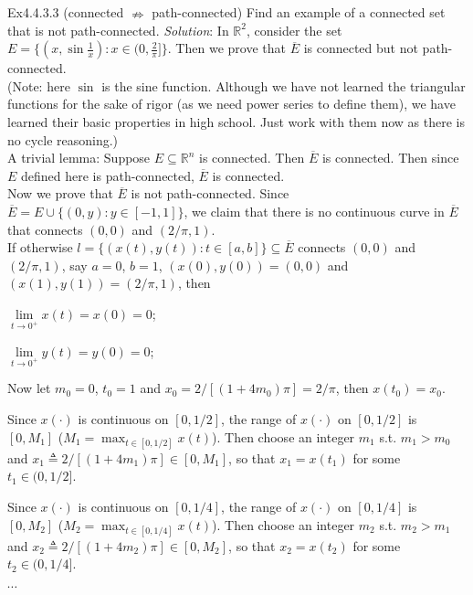 \documentclass{article}
\begin{document}
\begin{Th}{Ex4.4.3.3 (connected $\nRightarrow$ path-connected)}
    Find an example of a connected set that is not path-connected.
    \tcblower
    \textit{Solution}: In $\mathbb{R}^2$, consider the set $E = \{(x, \sin\frac{1}{x}): x\in (0,\frac{2}{\pi}]\}$. Then we prove that $\overline{E}$ is connected but not path-connected. \\
    (Note: here $\sin$ is the sine function. Although we have not learned the triangular functions for the sake of rigor (as we need power series to define them), we have learned their basic properties in high school. Just work with them now as there is no cycle reasoning.)\\
    A trivial lemma: \textcolor{Th}{Suppose $E\subseteq\mathbb{R}^n$ is connected. Then $\overline{E}$ is connected.} Then since $E$ defined here is path-connected, $\overline{E}$ is connected. \\
    Now we prove that $\overline{E}$ is not path-connected. Since $\overline{E} = E\cup\{(0, y): y\in [-1,1]\}$, we claim that there is no continuous curve in $\overline{E}$ that connects $(0,0)$ and $(2/\pi, 1)$. \\
    If otherwise $l = \{(x(t), y(t)): t\in [a,b]\}\subseteq \overline{E}$ connects $(0,0)$ and $(2/\pi, 1)$, say $a=0$, $b=1$, $(x(0), y(0)) = (0,0)$ and $(x(1), y(1)) = (2/\pi, 1)$, then 
    \begin{compactenum}
        \item $\lim\limits_{t\to 0^+} x(t) = x(0) = 0$;
        \item $\lim\limits_{t\to 0^+} y(t) = y(0) = 0$;
    \end{compactenum}
    Now let $m_0 = 0$, $t_0=1$ and $x_0 = 2/[(1+4m_0)\pi] = 2/\pi$, then $x(t_0) = x_0$. 
    \begin{compactenum}
        \item Since $x(\cdot)$ is continuous on $[0,1/2]$, the range of $x(\cdot)$ on $[0,1/2]$ is $[0, M_1]$ ($M_1 = \max_{t\in[0,1/2]}x(t)$). Then choose an integer $m_1$ s.t. $m_1>m_0$ and $x_1\triangleq 2/[(1+4m_1)\pi]\in [0, M_1]$, so that $x_1 = x(t_1)$ for some $t_1\in (0, 1/2]$.
        \item Since $x(\cdot)$ is continuous on $[0,1/4]$, the range of $x(\cdot)$ on $[0,1/4]$ is $[0, M_2]$ ($M_2 = \max_{t\in[0,1/4]}x(t)$). Then choose an integer $m_2$ s.t. $m_2>m_1$ and $x_2\triangleq 2/[(1+4m_2)\pi]\in [0, M_2]$, so that $x_2 = x(t_2)$ for some $t_2\in (0, 1/4]$.
        \item $\cdots$

\end{compactenum}
\end{Th}
\end{document}
